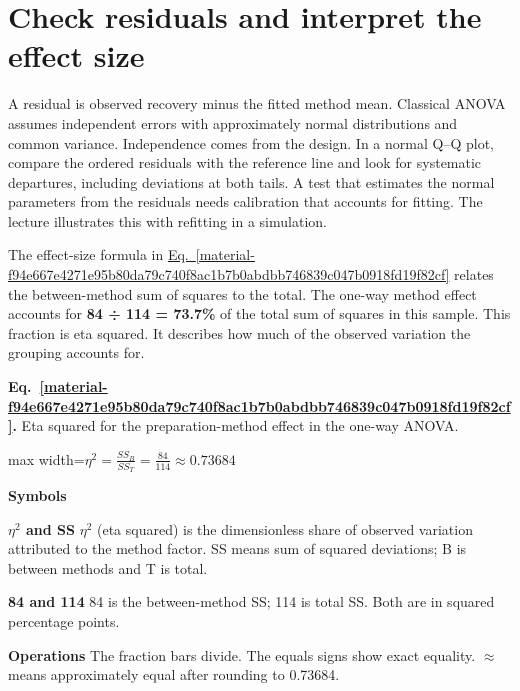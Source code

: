 \documentclass[11pt,a4paper]{article}
\begin{document}
\medskip

\clearpage
\section{Check residuals and interpret the effect size}
A residual is observed recovery minus the fitted method mean. Classical ANOVA assumes independent errors with approximately normal distributions and common variance. Independence comes from the design. In a normal Q–Q plot, compare the ordered residuals with the reference line and look for systematic departures, including deviations at both tails. A test that estimates the normal parameters from the residuals needs calibration that accounts for fitting. The lecture illustrates this with refitting in a simulation.


The effect-size formula in \hyperref[material-f94e667e4271e95b80da79c740f8ac1b7b0abdbb746839c047b0918fd19f82cf]{Eq.~\ref*{material-f94e667e4271e95b80da79c740f8ac1b7b0abdbb746839c047b0918fd19f82cf}} relates the between-method sum of squares to the total. The one-way method effect accounts for \textbf{84 ÷ 114 = 73.7\%} of the total sum of squares in this sample. This fraction is eta squared. It describes how much of the observed variation the grouping accounts for.


\par\medskip
\noindent\begin{minipage}{\linewidth}
\label{material-f94e667e4271e95b80da79c740f8ac1b7b0abdbb746839c047b0918fd19f82cf}
\noindent\textbf{Eq.~\ref*{material-f94e667e4271e95b80da79c740f8ac1b7b0abdbb746839c047b0918fd19f82cf}.} Eta squared for the preparation-method effect in the one-way ANOVA.\par\nopagebreak
\begin{center}\begin{adjustbox}{max width=\linewidth}$\displaystyle \eta^2=\frac{SS_B}{SS_T}=\frac{84}{114}\approx0.73684$\end{adjustbox}\end{center}

\par\noindent\textbf{Symbols}

\par\noindent\textbf{\ensuremath{\eta}\ensuremath{{}^2} and SS} \ensuremath{\eta}\ensuremath{{}^2} (eta squared) is the dimensionless share of observed variation attributed to the method factor. SS means sum of squared deviations; B is between methods and T is total.

\par\noindent\textbf{84 and 114} 84 is the between-method SS; 114 is total SS. Both are in squared percentage points.

\par\noindent\textbf{Operations} The fraction bars divide. The equals signs show exact equality. \ensuremath{\approx} means approximately equal after rounding to 0.73684.

\end{minipage}\par
\medskip
\end{document}
